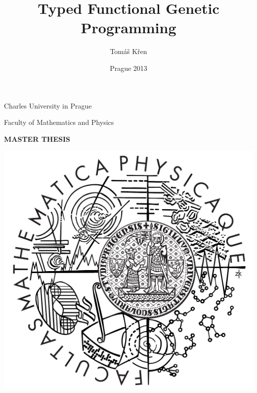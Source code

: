 \documentclass[12pt,a4paper]{report}
\title{Typed Functional Genetic Programming}
\author{Tomáš Křen}
\date{Prague 2013}
\begin{document}


\pagestyle{empty}
\begin{center}

\large

Charles University in Prague

\medskip

Faculty of Mathematics and Physics

\vfill

{\bf\Large MASTER THESIS}

\vfill



\includegraphics[scale=0.15]{logomff.png}

\vfill
\vspace{5mm}


\end{center}
\end{document}
